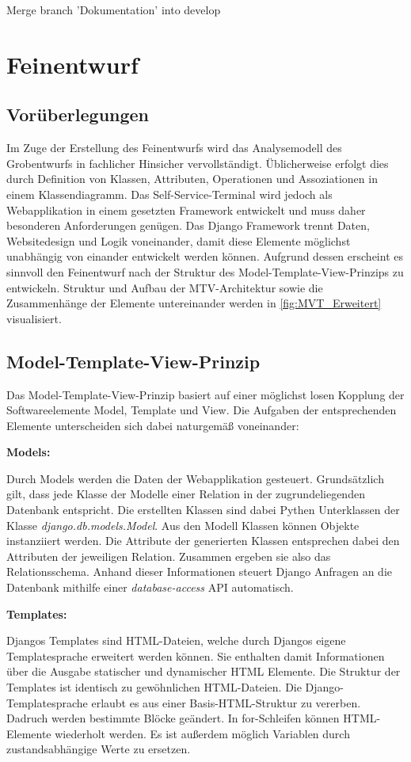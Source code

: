 Merge branch 'Dokumentation' into develop\section{Feinentwurf}
\subsection{Vorüberlegungen}
Im Zuge der Erstellung des Feinentwurfs wird das Analysemodell des Grobentwurfs in fachlicher Hinsicher vervollständigt. Üblicherweise erfolgt dies durch Definition von Klassen, Attributen, Operationen und Assoziationen in einem Klassendiagramm. Das Self-Service-Terminal wird jedoch als Webapplikation in einem gesetzten Framework entwickelt und muss daher besonderen Anforderungen genügen.
Das Django Framework trennt Daten, Websitedesign und Logik voneinander, damit diese Elemente möglichst unabhängig von einander entwickelt werden können. Aufgrund dessen erscheint es sinnvoll den Feinentwurf nach der Struktur des Model-Template-View-Prinzips zu entwickeln. Struktur und Aufbau der MTV-Architektur sowie die Zusammenhänge der Elemente untereinander werden in \ref{fig:MVT_Erweitert} visualisiert.

\vspace{0,5cm}

\subsection{Model-Template-View-Prinzip}
Das Model-Template-View-Prinzip basiert auf einer möglichst losen Kopplung der Softwareelemente Model, Template und View. Die Aufgaben der entsprechenden Elemente unterscheiden sich dabei naturgemäß voneinander:\par 
\newpage 
\noindent \textbf{Models:} \par
\vspace{0,5cm}
\noindent Durch Models werden die Daten der Webapplikation gesteuert. Grundsätzlich gilt, dass jede Klasse der Modelle einer Relation in der zugrundeliegenden Datenbank entspricht. Die erstellten Klassen sind dabei Pythen Unterklassen der Klasse \textit{django.db.models.Model}. Aus den Modell Klassen können Objekte instanziiert werden. Die Attribute der generierten Klassen entsprechen dabei den Attributen der jeweiligen Relation. Zusammen ergeben sie also das Relationsschema. Anhand dieser Informationen steuert Django Anfragen an die Datenbank mithilfe einer \textit{database-access} API automatisch.\par
\vspace{1cm}
\noindent \textbf{Templates:}\par
\vspace{0,5cm}
\noindent Djangos Templates sind HTML-Dateien, welche durch Djangos eigene Templatesprache erweitert werden können. Sie enthalten damit Informationen über die Ausgabe statischer und dynamischer HTML Elemente. Die Struktur der Templates ist identisch zu gewöhnlichen HTML-Dateien. Die Django-Templatesprache erlaubt es aus einer Basis-HTML-Struktur zu vererben. Dadruch werden bestimmte Blöcke geändert. In for-Schleifen können HTML-Elemente wiederholt werden. Es ist außerdem möglich Variablen durch zustandsabhängige Werte zu ersetzen.

